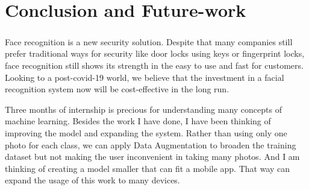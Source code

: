 \chapter{Conclusion and Future-work}
\paragraph{}
Face recognition is a new security solution. Despite that many companies still prefer traditional ways for security like door locks using keys or fingerprint locks, face recognition still shows its strength in the easy to use and fast for customers. Looking to a post-\acrshort{covid-19} world, we believe that the investment in a facial recognition system now will be cost-effective in the long run.\par


Three months of internship is precious for understanding many concepts of machine learning. Besides the work I have done, I have been thinking of improving the model and expanding the system. Rather than using only one photo for each class, we can apply Data Augmentation to broaden the training dataset but not making the user inconvenient in taking many photos. And I am thinking of creating a model smaller that can fit a mobile app. That way can expand the usage of this work to many devices. 